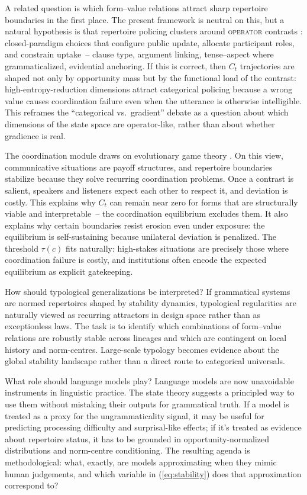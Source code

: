 \documentclass[12pt,letterpaper]{article}
\newcommand{\term}[1]{\textsc{#1}}
\begin{document}
A related question is which form--value relations attract sharp repertoire boundaries in the first place. The present framework is neutral on this, but a natural hypothesis is that repertoire policing clusters around \term{operator} contrasts \autocite{reynolds2026operators}: closed-paradigm choices that configure public update, allocate participant roles, and constrain uptake~-- clause type, argument linking, tense--aspect where grammaticalized, evidential anchoring. If this is correct, then $C_t$ trajectories are shaped not only by opportunity mass but by the functional load of the contrast: high-entropy-reduction dimensions attract categorical policing because a wrong value causes coordination failure even when the utterance is otherwise intelligible. This reframes the \enquote{categorical vs.\ gradient} debate as a question about which dimensions of the state space are operator-like, rather than about whether gradience is real.

The coordination module draws on evolutionary game theory \autocite{oconnor2019games, lewis1969}. On this view, communicative situations are payoff structures, and repertoire boundaries stabilize because they solve recurring coordination problems. Once a contrast is salient, speakers and listeners expect each other to respect it, and deviation is costly. This explains why $C_t$ can remain near zero for forms that are structurally viable and interpretable~-- the coordination equilibrium excludes them. It also explains why certain boundaries resist erosion even under exposure: the equilibrium is self-sustaining because unilateral deviation is penalized. The threshold $\tau(c)$ fits naturally: high-stakes situations are precisely those where coordination failure is costly, and institutions often encode the expected equilibrium as explicit gatekeeping.

How should typological generalizations be interpreted? If grammatical systems are normed repertoires shaped by stability dynamics, typological regularities are naturally viewed as recurring attractors in design space rather than as exceptionless laws. The task is to identify which combinations of form--value relations are robustly stable across lineages and which are contingent on local history and norm-centres. Large-scale typology becomes evidence about the global stability landscape rather than a direct route to categorical universals.

What role should language models play? Language models are now unavoidable instruments in linguistic practice. The state theory suggests a principled way to use them without mistaking their outputs for grammatical truth. If a model is treated as a proxy for the ungrammaticality signal, it may be useful for predicting processing difficulty and surprisal-like effects; if it's treated as evidence about repertoire status, it has to be grounded in opportunity-normalized distributions and norm-centre conditioning. The resulting agenda is methodological: what, exactly, are models approximating when they mimic human judgements, and which variable in (\ref{eq:stability}) does that approximation correspond to?
\end{document}
